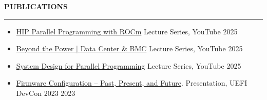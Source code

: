 \documentclass{resume} %
\renewenvironment{rSection}[1]{ %
  \sectionskip
  \textcolor{primaryColor}{\MakeUppercase{\bf #1}} %
  \sectionlineskip
  {\color{primaryColor}\hrule} %
  \begin{list}{}{ %
    \setlength{\leftmargin}{1.5em} %
  }
  \item[]
}{
  \end{list}
}
\begin{document}
\begin{rSection}{Publications}

\begin{itemize}
    \item \href{https://youtube.com/playlist?list=PLWyBQeJgIuzDFELUK9ineNkOr9LuYatkR&si=mUVeIkLFK5gzyZa7}{HIP Parallel Programming with ROCm} Lecture Series, YouTube  \hfill {2025}
    \item \href{https://youtube.com/playlist?list=PLWyBQeJgIuzC6oN8AihmSMkgheX9TLDaW&si=HAOmHXKP4KdsAzPX}{Beyond the Power | Data Center \& BMC} Lecture Series, YouTube  \hfill {2025}
    \item \href{https://www.youtube.com/playlist?list=PLWyBQeJgIuzD2o9ZVw5oI-P2fX4uyNKZA}{System Design for Parallel Programming} Lecture Series, YouTube  \hfill {2025}
    \item \href{https://uefi.org/sites/default/files/resources/Firmware%20Configuration%20%E2%80%93%20Past%2C%20Present%2C%20and%20Future_Zimmer.pdf}{Firmware Configuration – Past, Present, and Future}. Presentation, UEFI DevCon 2023 \hfill {2023}
\end{itemize}


\end{rSection}
\end{document}
